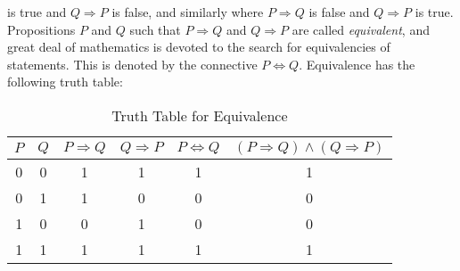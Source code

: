         is true and $Q\Rightarrow{P}$ is false, and similarly where
        $P\Rightarrow{Q}$ is false and $Q\Rightarrow{P}$ is true. Propositions
        $P$ and $Q$ such that $P\Rightarrow{Q}$ and $Q\Rightarrow{P}$ are called
        \textit{equivalent}, and great deal of mathematics is devoted to the
        search for equivalencies of statements. This is denoted by the
        connective $P\Leftrightarrow{Q}$. Equivalence has the following truth
        table:
        \begin{table}[H]
            \centering
            \captionsetup{type=table}
            \begin{tabular}{cccccc}
                $P$&$Q$&$P\Rightarrow{Q}$&$Q\Rightarrow{P}$
                   &$P\Leftrightarrow{Q}$
                   &$(P\Rightarrow{Q})\land(Q\Rightarrow{P})$\\
                \hline
                0&0&1&1&1&1\\
                0&1&1&0&0&0\\
                1&0&0&1&0&0\\
                1&1&1&1&1&1
            \end{tabular}
            \caption{Truth Table for Equivalence}
            \label{tab:Truth_Table_for_Equivalence}
        \end{table}